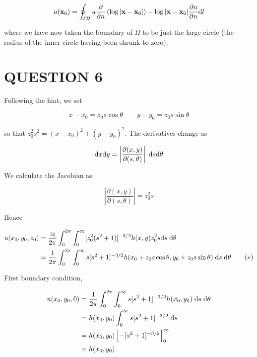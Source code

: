 \documentclass[a4paper]{article}
\begin{document}
\[ u(\mathbf{x}_{0}) = \oint_{\delta \mathcal{D}} u \frac{\partial }{\partial n} \left(  \log| \mathbf{x} - \mathbf{x}_{0} |   \right) -  \log| \mathbf{x} - \mathbf{x}_{0} |  \frac{\partial u }{\partial n} \mathrm{d} l  \]

where we have now taken the boundary of $ \Omega $ to be just the large circle (the radius of the inner circle having been shrunk to zero).







\section{QUESTION 6}

Following the hint, we set

\[ x - x_{0} = z_{0} s \cos \theta \qquad y - y_{0} = z_{0} s \sin \theta \]

so that $ z_{0}^{2}s^{2} = (x-x_{0})^{2} + (y - y_{0})^{2} $. The derivatives change as 

\[ \mathrm{d} x \mathrm{d} y = \left| \frac{\partial (x,y)}{\partial(s,\theta)} \right|\; \mathrm{d} s \mathrm{d} \theta \]

We calculate the Jacobian as 

\[ \left| \frac{\partial (x,y)}{\partial(s,\theta)} \right| = z_{0}^{2} s \]

Hence

\begin{align*}
u(x_{0},y_{0},z_{0})& = \frac{z_{0}}{2\pi} \int_{0}^{2\pi} \int_{0}^{\infty} [z_{0}^{2}(s^{2} + 1)]^{-3/2} h(x,y) z_{0}^{2} s \mathrm{d} s \; \mathrm{d} \theta  \\
& = \frac{1}{2\pi} \int_{0}^{2\pi} \int_{0}^{\infty} s[s^{2} + 1]^{-3/2} h(x_{0} + z_{0} s \cos \theta, y_{0} + z_{0} s \sin \theta) \; \mathrm{d} s \; \mathrm{d} \theta \qquad (*) \\
\end{align*}

First boundary condition,


\begin{align*}
u(x_{0},y_{0},0) & = \frac{1}{2\pi} \int_{0}^{2\pi} \int_{0}^{\infty} s[s^{2} + 1]^{-3/2} h(x_{0}, y_{0}) \; \mathrm{d} s \; \mathrm{d} \theta \\
& = h(x_{0},y_{0}) \int_{0}^{\infty} s[s^{2} + 1]^{-3/2} \; \mathrm{d} s \\
& = h(x_{0},y_{0}) \left[ - [s^{2} + 1]^{-3/2} \right]_{0}^{\infty} \\
& = h(x_{0},y_{0})
\end{align*}
\end{document}
